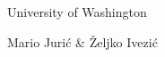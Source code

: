 {\centerline {\color{blue}  University of Washington}}
{\centerline {\color{blue} Mario Juri\'{c} \& \v{Z}eljko Ivezi\'{c}}}
\vskip 1in